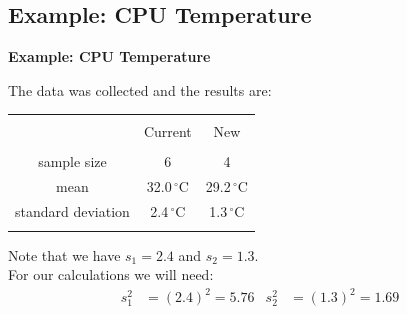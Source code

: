 \documentclass[compress]{beamer}        %
\makeatletter
\newcommand{\tcb}{\textcolor{beamer@blendedblue}}
\makeatother
\begin{document}
\subsection{Example: CPU Temperature}
\begin{frame}{\bf \tcb{Example: CPU Temperature}}

The data was collected and the results are:
\begin{center}
\begin{tabular}{|c|c|c|}
\hline
&&\\[-0.3cm]
& Current & New \\
\hline
&&\\[-0.2cm]
sample size      & 6 & 4 \\[0.2cm]
mean   &  32.0\,$^\circ$C  & 29.2\,$^\circ$C \\[0.2cm]
standard deviation & 2.4\,$^\circ$C & 1.3\,$^\circ$C \\[0.2cm]
\hline
\multicolumn{2}{c}{}
\end{tabular}
\end{center}

Note that we have $s_1 = 2.4$ and $s_2 = 1.3$.\\[0.6cm]

For our calculations we will need:
\begin{align*}
s_1^2 &= (2.4)^2 = 5.76 &s_2^2 &= (1.3)^2 = 1.69
\end{align*}

\end{frame}
\end{document}
